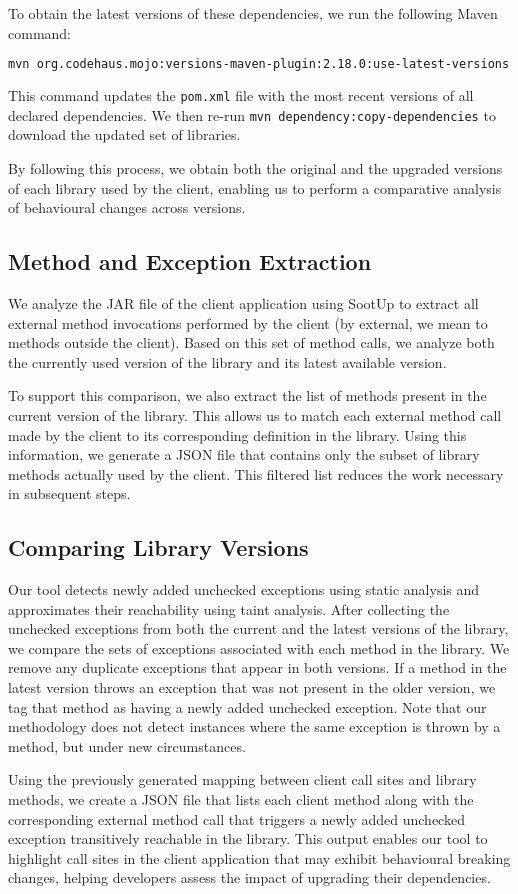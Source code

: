 To obtain the latest versions of these dependencies, we run the following Maven command:
\begin{lstlisting}[language=bash, breaklines=true, basicstyle=\ttfamily\small]
mvn org.codehaus.mojo:versions-maven-plugin:2.18.0:use-latest-versions
\end{lstlisting}
This command updates the \texttt{pom.xml} file with the most recent versions of all declared dependencies. We then re-run \texttt{mvn dependency:copy-dependencies} to download the updated set of libraries.

By following this process, we obtain both the original and the upgraded versions of each library used by the client, enabling us to perform a comparative analysis of behavioural changes across versions.

\subsection{Method and Exception Extraction}

We analyze the JAR file of the client application using SootUp to extract all external method invocations performed by the client (by external, we mean to methods outside the client). Based on this set of method calls, we analyze both the currently used version of the library and its latest available version.

To support this comparison, we also extract the list of methods present in the current version of the library. This allows us to match each external method call made by the client to its corresponding definition in the library. Using this information, we generate a JSON file that contains only the subset of library methods actually used by the client. This filtered list reduces the work necessary in subsequent steps.

\subsection{Comparing Library Versions}

Our tool detects newly added unchecked exceptions using static analysis and approximates their reachability using taint analysis. After collecting the unchecked exceptions from both the current and the latest versions of the library, we compare the sets of exceptions associated with each method in the library. We remove any duplicate exceptions that appear in both versions. If a method in the latest version throws an exception that was not present in the older version, we tag that method as having a newly added unchecked exception. Note that our methodology does not detect instances where the same exception is thrown by a method, but under new circumstances.

Using the previously generated mapping between client call sites and library methods, we create a JSON file that lists each client method along with the corresponding external method call that triggers a newly added unchecked exception transitively reachable in the library. This output enables our tool to highlight call sites in the client application that may exhibit behavioural breaking changes, helping developers assess the impact of upgrading their dependencies.
